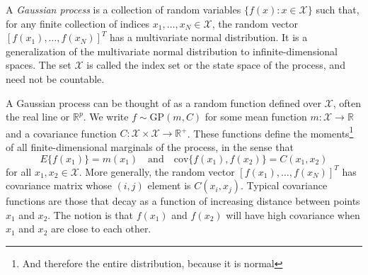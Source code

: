 \documentclass{homework}
\begin{document}
A \textit{Gaussian process} is a collection of random variables $\{f(x): x \in \mathcal{X}\}$ such that, for any finite collection of indices $x_1, \ldots, x_N \in \mathcal{X}$, the random vector $[f(x_1), \ldots, f(x_N)]^T$ has a multivariate normal distribution.  It is a generalization of the multivariate normal distribution to infinite-dimensional spaces. The set $\mathcal{X}$ is called the index set or the state space of the process, and need not be countable.

A Gaussian process can be thought of as a random function defined over $\mathcal{X}$, often the real line or $\mathbb{R}^p$.  We write $f \sim \mbox{GP}(m, C)$ for some mean function $m: \mathcal{X} \rightarrow \mathbb{R}$ and a covariance function $C: \mathcal{X} \times \mathcal{X} \rightarrow \mathbb{R}^+$.  These functions define the moments\footnote{And therefore the entire distribution, because it is normal} of all finite-dimensional marginals of the process, in the sense that
$$
E\{ f(x_1) \} = m(x_1) \quad \mbox{and} \quad \mbox{cov}\{f(x_1), f(x_2) \} = C(x_1, x_2)
$$
for all $x_1, x_2 \in \mathcal{X}$.  More generally, the random vector $[f(x_1), \ldots, f(x_N)]^T$ has covariance matrix whose $(i,j)$ element is $C(x_i, x_j)$.  Typical covariance functions are those that decay as a function of increasing distance between points $x_1$ and $x_2$.  The notion is that $f(x_1)$ and $f(x_2)$ will have high covariance when $x_1$ and $x_2$ are close to each other.
\end{document}
